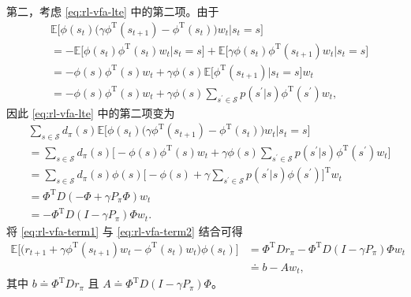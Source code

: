 \begin{note}[方框 8.3：证明引理 8.1]
第二，考虑 \cref{eq:rl-vfa-lte} 中的第二项。由于
\begin{equation*}
\begin{aligned}
& \mathbb{E}\Big[\phi(s_{t}) \big(\gamma \phi^{\mathrm{T}}(s_{t+1}) - \phi^{\mathrm{T}}(s_{t})\big) w_{t} \big| s_{t} = s\Big] \\
&= -\mathbb{E}\Big[\phi(s_{t}) \phi^{\mathrm{T}}(s_{t}) w_{t} \big| s_{t} = s\Big] + \mathbb{E}\Big[\gamma \phi(s_{t}) \phi^{\mathrm{T}}(s_{t+1}) w_{t} \big| s_{t} = s\Big] \\
&= -\phi(s) \phi^{\mathrm{T}}(s) w_{t} + \gamma \phi(s) \mathbb{E}\Big[\phi^{\mathrm{T}}(s_{t+1}) \big| s_{t} = s\Big] w_{t} \\
&= -\phi(s) \phi^{\mathrm{T}}(s) w_{t} + \gamma \phi(s) \sum_{s^{\prime} \in \mathcal{S}} p(s^{\prime} | s) \phi^{\mathrm{T}}(s^{\prime}) w_{t},
\end{aligned}
\end{equation*}
因此 \cref{eq:rl-vfa-lte} 中的第二项变为
\begin{equation}
\begin{aligned}
& \sum_{s \in \mathcal{S}} d_{\pi}(s) \mathbb{E}\Big[\phi(s_{t}) \big(\gamma \phi^{\mathrm{T}}(s_{t+1}) - \phi^{\mathrm{T}}(s_{t})\big) w_{t} \big| s_{t} = s\Big] \\
&= \sum_{s \in \mathcal{S}} d_{\pi}(s) \Big[-\phi(s) \phi^{\mathrm{T}}(s) w_{t} + \gamma \phi(s) \sum_{s^{\prime} \in \mathcal{S}} p(s^{\prime} | s) \phi^{\mathrm{T}}(s^{\prime}) w_{t}\Big] \\
&= \sum_{s \in \mathcal{S}} d_{\pi}(s) \phi(s) \Big[-\phi(s) + \gamma \sum_{s^{\prime} \in \mathcal{S}} p(s^{\prime} | s) \phi(s^{\prime})\Big]^{\mathrm{T}} w_{t} \\
&= \Phi^{\mathrm{T}} D (-\Phi + \gamma P_{\pi} \Phi) w_{t} \\
&= -\Phi^{\mathrm{T}} D (I - \gamma P_{\pi}) \Phi w_{t}.
\end{aligned}
\label{eq:rl-vfa-term2}
\end{equation}
将 \cref{eq:rl-vfa-term1} 与 \cref{eq:rl-vfa-term2} 结合可得
\begin{equation}
\begin{aligned}
\mathbb{E}\Big[\big(r_{t+1} + \gamma \phi^{\mathrm{T}}(s_{t+1}) w_{t} - \phi^{\mathrm{T}}(s_{t}) w_{t}\big) \phi(s_{t})\Big] &= \Phi^{\mathrm{T}} D r_{\pi} - \Phi^{\mathrm{T}} D (I - \gamma P_{\pi}) \Phi w_{t} \\
&\doteq b - A w_{t},
\end{aligned}
\label{eq:rl-vfa-bAw}
\end{equation}
其中 $b \doteq \Phi^{\mathrm{T}} Dr_{\pi}$ 且 $A \doteq \Phi^{\mathrm{T}} D (I - \gamma P_{\pi}) \Phi$。
\end{note}

